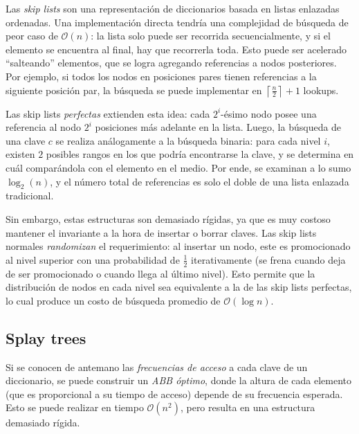 \documentclass{article}
\newcommand{\BigO}[1]{{\mathcal{O}(#1)}}
\begin{document}
Las \textit{skip lists} son una representación de diccionarios basada en listas enlazadas ordenadas. Una implementación directa tendría una complejidad de búsqueda de peor caso de $\BigO{n}$: la lista solo puede ser recorrida secuencialmente, y si el elemento se encuentra al final, hay que recorrerla toda. Esto puede ser acelerado ``salteando'' elementos, que se logra agregando referencias a nodos posteriores. Por ejemplo, si todos los nodos en posiciones pares tienen referencias a la siguiente posición par, la búsqueda se puede implementar en $\left\lceil \frac{n}{2} \right\rceil + 1$ lookups.

Las skip lists \textit{perfectas} extienden esta idea: cada $2^i$-ésimo nodo posee una referencia al nodo $2^i$ posiciones más adelante en la lista. Luego, la búsqueda de una clave $c$ se realiza análogamente a la búsqueda binaria: para cada nivel $i$, existen $2$ posibles rangos en los que podría encontrarse la clave, y se determina en cuál comparándola con el elemento en el medio. Por ende, se examinan a lo sumo $\log_2(n)$, y el número total de referencias es solo el doble de una lista enlazada tradicional.

Sin embargo, estas estructuras son demasiado rígidas, ya que es muy costoso mantener el invariante a la hora de insertar o borrar claves. Las skip lists normales \textit{randomizan} el requerimiento: al insertar un nodo, este es promocionado al nivel superior con una probabilidad de $\frac{1}{2}$ iterativamente (se frena cuando deja de ser promocionado o cuando llega al último nivel). Esto permite que la distribución de nodos en cada nivel sea equivalente a la de las skip lists perfectas, lo cual produce un costo de búsqueda promedio de $\BigO{\log{n}}$.

\subsection{Splay trees}

Si se conocen de antemano las \textit{frecuencias de acceso} a cada clave de un diccionario, se puede construir un \textit{ABB óptimo}, donde la altura de cada elemento (que es proporcional a su tiempo de acceso) depende de su frecuencia esperada. Esto se puede realizar en tiempo $\BigO{n^2}$, pero resulta en una estructura demasiado rígida.
\end{document}
